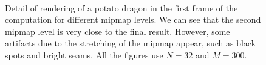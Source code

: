 \begin{figure}[!h]
\vspace{-0.5cm}
\centering
{}
 \\


\caption{Detail of rendering of a potato dragon in the first frame of the computation for different mipmap levels. We can see that the second mipmap level is very close to the final result. However, some artifacts due to the stretching of the mipmap appear, such as black spots and bright seams. All the figures use $N = 32$ and $M = 300$.}
\label{fig:mipblurring}
\end{figure}
\FloatBarrier

